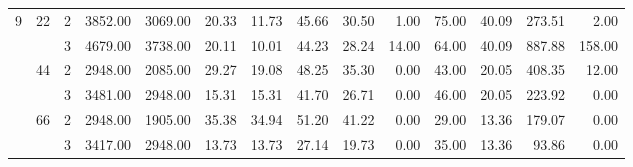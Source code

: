 \begin{tabular}{lllrrrrrrrrrrr}
\cline{2-14}
\multirow{6}{*}{9} & \multirow{2}{*}{22} & 2 &  3852.00 &   3069.00 & 20.33 &   11.73 &   45.66 &   30.50 &    1.00 &   75.00 &   40.09 &  273.51 &     2.00 \\
  &    & 3 &  4679.00 &   3738.00 & 20.11 &   10.01 &   44.23 &   28.24 &   14.00 &   64.00 &   40.09 &  887.88 &   158.00 \\
\cline{2-14}
  & \multirow{2}{*}{44} & 2 &  2948.00 &   2085.00 & 29.27 &   19.08 &   48.25 &   35.30 &    0.00 &   43.00 &   20.05 &  408.35 &    12.00 \\
  &    & 3 &  3481.00 &   2948.00 & 15.31 &   15.31 &   41.70 &   26.71 &    0.00 &   46.00 &   20.05 &  223.92 &     0.00 \\
\cline{2-14}
  & \multirow{2}{*}{66} & 2 &  2948.00 &   1905.00 & 35.38 &   34.94 &   51.20 &   41.22 &    0.00 &   29.00 &   13.36 &  179.07 &     0.00 \\
  &    & 3 &  3417.00 &   2948.00 & 13.73 &   13.73 &   27.14 &   19.73 &    0.00 &   35.00 &   13.36 &   93.86 &     0.00 \\
\bottomrule
\end{tabular}
